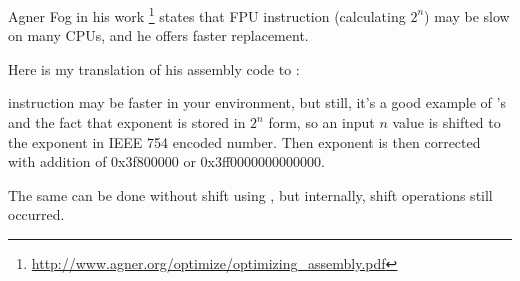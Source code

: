 
Agner Fog in his  work
\footnote{\url{http://www.agner.org/optimize/optimizing_assembly.pdf}} states that  \ac{FPU} instruction
(calculating $2^n$) may be slow on many CPUs, and he offers faster replacement.

Here is my translation of his assembly code to \CCpp:



 instruction may be faster in your environment, but still, it's a good example of 's and the fact
that exponent is stored in $2^n$ form,
so an input $n$ value is shifted to the exponent in IEEE 754 encoded number.
Then exponent is then corrected with addition of 0x3f800000 or 0x3ff0000000000000.

The same can be done without shift using , but internally, shift operations still occurred.

